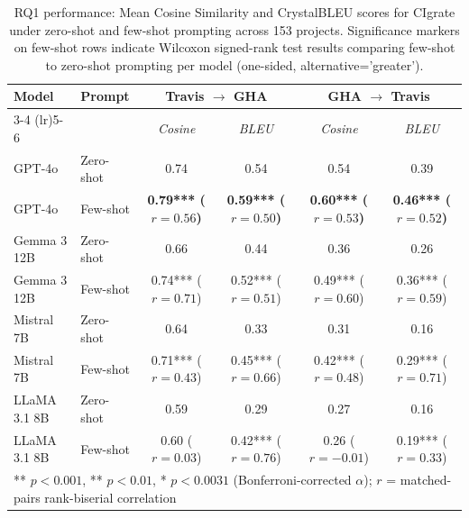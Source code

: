 \begin{table}[t]
\centering
\caption{RQ1 performance: Mean Cosine Similarity and CrystalBLEU scores for CIgrate under zero-shot and few-shot prompting across 153 projects. Significance markers on few-shot rows indicate Wilcoxon signed-rank test results comparing few-shot to zero-shot prompting per model (one-sided, alternative='greater').}
\label{tab:rq1-performance}
\begin{tabular}{llcccc}
\toprule
\textbf{Model} & \textbf{Prompt} &
\multicolumn{2}{c}{\textbf{Travis $\rightarrow$ GHA}} &
\multicolumn{2}{c}{\textbf{GHA $\rightarrow$ Travis}} \\
\cmidrule(lr){3-4} \cmidrule(lr){5-6}
& & \textit{Cosine} & \textit{BLEU} & \textit{Cosine} & \textit{BLEU} \\
\midrule
GPT-4o & Zero-shot & 0.74 & 0.54 & 0.54 & 0.39 \\
GPT-4o & Few-shot & \textbf{0.79*** ($r=0.56$)} & \textbf{0.59*** ($r=0.50$)} & \textbf{0.60*** ($r=0.53$)} & \textbf{0.46*** ($r=0.52$)} \\
\midrule
Gemma 3 12B & Zero-shot & 0.66 & 0.44 & 0.36 & 0.26 \\
Gemma 3 12B & Few-shot & 0.74*** ($r=0.71$) & 0.52*** ($r=0.51$) & 0.49*** ($r=0.60$) & 0.36*** ($r=0.59$) \\
\midrule
Mistral 7B & Zero-shot & 0.64 & 0.33 & 0.31 & 0.16 \\
Mistral 7B & Few-shot & 0.71*** ($r=0.43$) & 0.45*** ($r=0.66$) & 0.42*** ($r=0.48$) & 0.29*** ($r=0.71$) \\
\midrule
LLaMA 3.1 8B & Zero-shot & 0.59 & 0.29 & 0.27 & 0.16 \\
LLaMA 3.1 8B & Few-shot & 0.60 ($r=0.03$) & 0.42*** ($r=0.76$) & 0.26 ($r=-0.01$) & 0.19*** ($r=0.33$) \\
\bottomrule
\multicolumn{6}{l}{\footnotesize *** $p < 0.001$, ** $p < 0.01$, * $p < 0.0031$ (Bonferroni-corrected $\alpha$); $r$ = matched-pairs rank-biserial correlation} \\
\end{tabular}
\end{table}
